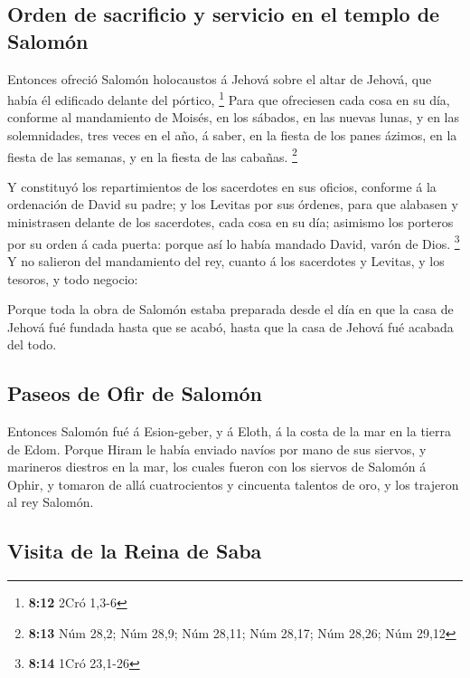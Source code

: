 \hypertarget{orden-de-sacrificio-y-servicio-en-el-templo-de-salomuxf3n}{%
\subsection{Orden de sacrificio y servicio en el templo de
Salomón}\label{orden-de-sacrificio-y-servicio-en-el-templo-de-salomuxf3n}}

 Entonces ofreció Salomón holocaustos á Jehová sobre el
altar de Jehová, que había él edificado delante del pórtico, \footnote{\textbf{8:12}
  2Cró 1,3-6}  Para que ofreciesen cada cosa en su día,
conforme al mandamiento de Moisés, en los sábados, en las nuevas lunas,
y en las solemnidades, tres veces en el año, á saber, en la fiesta de
los panes ázimos, en la fiesta de las semanas, y en la fiesta de las
cabañas. \footnote{\textbf{8:13} Núm 28,2; Núm 28,9; Núm 28,11; Núm
  28,17; Núm 28,26; Núm 29,12}

 Y constituyó los repartimientos de los sacerdotes en sus
oficios, conforme á la ordenación de David su padre; y los Levitas por
sus órdenes, para que alabasen y ministrasen delante de los sacerdotes,
cada cosa en su día; asimismo los porteros por su orden á cada puerta:
porque así lo había mandado David, varón de Dios. \footnote{\textbf{8:14}
  1Cró 23,1-26}  Y no salieron del mandamiento del rey,
cuanto á los sacerdotes y Levitas, y los tesoros, y todo negocio:

 Porque toda la obra de Salomón estaba preparada desde el
día en que la casa de Jehová fué fundada hasta que se acabó, hasta que
la casa de Jehová fué acabada del todo.

\hypertarget{paseos-de-ofir-de-salomuxf3n}{%
\subsection{Paseos de Ofir de
Salomón}\label{paseos-de-ofir-de-salomuxf3n}}

 Entonces Salomón fué á Esion-geber, y á Eloth, á la costa
de la mar en la tierra de Edom.  Porque Hiram le había
enviado navíos por mano de sus siervos, y marineros diestros en la mar,
los cuales fueron con los siervos de Salomón á Ophir, y tomaron de allá
cuatrocientos y cincuenta talentos de oro, y los trajeron al rey
Salomón.

\hypertarget{visita-de-la-reina-de-saba}{%
\subsection{Visita de la Reina de
Saba}\label{visita-de-la-reina-de-saba}}

